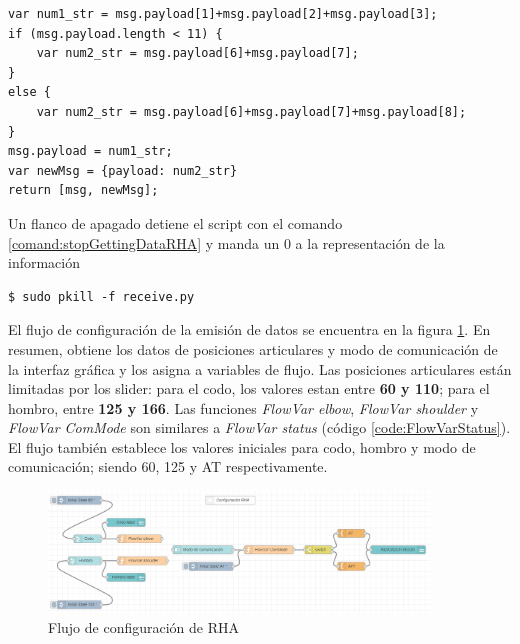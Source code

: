 
\begin{lstlisting}[frame=leftline, caption={Data Interpreter}, label=code:DataInterpreter]
var num1_str = msg.payload[1]+msg.payload[2]+msg.payload[3];
if (msg.payload.length < 11) {
    var num2_str = msg.payload[6]+msg.payload[7];
}
else {
    var num2_str = msg.payload[6]+msg.payload[7]+msg.payload[8];
}
msg.payload = num1_str;
var newMsg = {payload: num2_str}
return [msg, newMsg];
\end{lstlisting}

Un flanco de apagado detiene el script con el comando \ref{comand:stopGettingDataRHA} y manda un 0 a la representación de la información


\begin{lstlisting}[frame=single, label=command:stopGettingDataRHA]
$ sudo pkill -f receive.py
\end{lstlisting}

El flujo de configuración de la emisión de datos se encuentra en la figura \ref{fig:configRHA}. En resumen, obtiene los datos de posiciones articulares y modo de comunicación de la interfaz gráfica y los asigna a variables de flujo. Las posiciones articulares están limitadas por los slider: para el codo, los valores estan entre \textbf{60 y 110}; para el hombro, entre \textbf{125 y 166}. Las funciones \textit{FlowVar elbow}, \textit{FlowVar shoulder} y \textit{FlowVar ComMode} son similares a \textit{FlowVar status} (código \ref{code:FlowVarStatus}). El flujo también establece los valores iniciales para codo, hombro y modo de comunicación; siendo 60, 125 y AT respectivamente.

\begin{figure}[H]
\centering
\includegraphics[width=0.9\textwidth]{figuras/configFlowRHA.png}
\caption{Flujo de configuración de RHA}
\label{fig:configRHA}
\end{figure}

